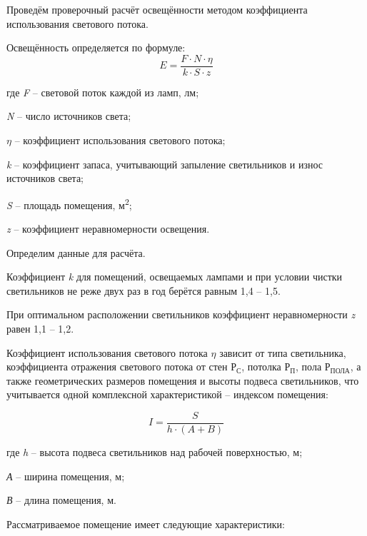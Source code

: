 Проведём проверочный расчёт освещённости методом коэффициента использования светового потока.

Освещённость определяется по формуле:
\begin{equation}
\label{eq:sunny}
E=\frac{F{\cdot}N{\cdot}\eta }{k{\cdot}S{\cdot}z}
\end{equation}

где \textit{F} – световой поток каждой из ламп, лм;

\textit{N} – число источников света;

\textit{$\eta $} – коэффициент использования светового потока;

\textit{k} – коэффициент запаса, учитывающий запыление светильников и износ источников света;

\textit{S} – площадь помещения, м\textsuperscript{2};

\textit{z} – коэффициент неравномерности освещения.

Определим данные для расчёта.

Коэффициент \textit{k} для помещений, освещаемых лампами и при условии чистки светильников не реже двух раз в год берётся равным 1,4 – 1,5.

При оптимальном расположении светильников коэффициент неравномерности \textit{z} равен 1,1 – 1,2.

Коэффициент использования светового потока $\eta$ зависит от типа светильника, коэффициента отражения светового потока от стен $\textit{Р}_{\textit{С}}$, потолка $\textit{Р}_{\textit{П}}$, пола $\textit{Р}_{\textit{ПОЛА}}$, а также геометрических размеров помещения и высоты подвеса светильников, что учитывается одной комплексной характеристикой – индексом помещения:

\begin{equation}
\label{eq:index_opt_flor}
I=\frac S{h{\cdot}(A+B)}
\end{equation}

где \textit{h} – высота подвеса светильников над рабочей поверхностью, м;

\textit{А} – ширина помещения, м;

\textit{В} – длина помещения, м.

Рассматриваемое помещение имеет следующие характеристики:

